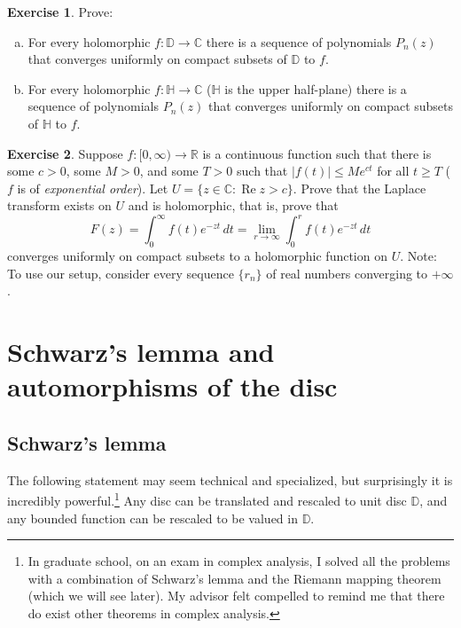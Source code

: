 \documentclass[12pt,openany]{book}
\renewcommand{\Re}{\operatorname{Re}}
\newcommand{\sabs}[1]{\lvert {#1} \rvert}
\newcommand{\C}{{\mathbb{C}}}
\newcommand{\R}{{\mathbb{R}}}
\newcommand{\D}{{\mathbb{D}}}
\newcommand{\bH}{{\mathbb{H}}}
\newcommand{\myindex}[1]{#1\index{#1}}
\theoremstyle{plain}
\theoremstyle{remark}
\theoremstyle{definition}
\newenvironment{exbox}{%
    \def\FrameCommand{\vrule width 1pt \relax\hspace{10pt}}%
    \MakeFramed{\advance\hsize-\width\FrameRestore}%
}{%
    \endMakeFramed
}
\newenvironment{exparts}{%
    \leavevmode\begin{enumerate}[a),noitemsep,topsep=0pt,parsep=0pt,partopsep=0pt]
}{%
    \end{enumerate}
}
\theoremstyle{exercise}
\newtheorem{exercise}{Exercise}[section]
\theoremstyle{example}
\begin{document}
\begin{exbox}
\begin{exercise}\label{exercise:polylimits}
\pagebreak[2]
Prove:
\begin{exparts}
\item
For every holomorphic $f \colon \D \to \C$ there
is a sequence of polynomials $P_n(z)$ that converges uniformly on compact
subsets of $\D$ to $f$.
\item
For every holomorphic $f \colon \bH \to \C$
($\bH$ is the upper half-plane) there
is a sequence of polynomials $P_n(z)$ that converges uniformly on compact
subsets of $\bH$ to $f$.
\end{exparts}
\end{exercise}

\begin{exercise}
\pagebreak[2]
Suppose $f \colon [0,\infty) \to \R$ is a continuous function such that
there is some $c > 0$, some $M > 0$, and some $T > 0$ such that 
$\sabs{f(t)} \leq M e^{ct}$ for all $t \geq T$
($f$ is of \emph{\myindex{exponential order}}).
Let $U = \{ z \in \C : \Re z > c \}$.  Prove that the Laplace transform
exists on $U$ and is holomorphic, that is, prove that
\begin{equation*}
F(z) = \int_0^\infty f(t) e^{-zt} \, dt = \lim_{r \to \infty} \int_0^r f(t)
e^{-zt} \, dt
\end{equation*}
converges uniformly on compact subsets to a holomorphic function on $U$.
Note: To use our setup, consider every sequence $\{ r_n \}$
of real numbers converging to $+\infty$.
\end{exercise}
\end{exbox}


\section{Schwarz's lemma and automorphisms of the disc}
\label{sec:schwarz}

\subsection{Schwarz's lemma}

The following statement may
seem technical and specialized, but surprisingly it is incredibly
powerful.\footnote{In graduate school, on an exam in complex
analysis, I solved all the problems with a combination of
Schwarz's lemma and the Riemann
mapping theorem (which we will see later).
My advisor
felt compelled to remind me that there do exist other theorems in complex
analysis.}
Any disc can be translated and rescaled to unit disc $\D$, and any
bounded function can be rescaled to be valued in $\D$.
\end{document}
